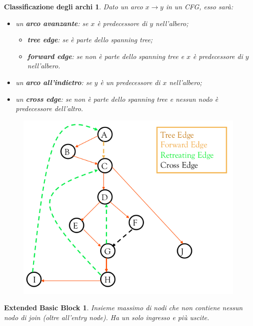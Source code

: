 \documentclass[a4paper, 10pt]{book}
\begin{document}
\newtheorem*{definit3}{Classificazione degli archi}
\begin{definit3}
	Dato un arco $x \rightarrow y$ in un CFG, esso sarà:
	\begin{itemize}
		\item un \textbf{arco avanzante}: se $x$ è predecessore di $y$ nell'albero;
		\begin{itemize}
			\item \textbf{tree edge}: se è parte dello spanning tree;
			\item \textbf{forward edge}: se non è parte dello spanning tree e $x$ è predecessore di $y$ nell'albero.
		\end{itemize}
		\item un \textbf{arco all'indietro}: se $y$ è un predecessore di $x$ nell'albero;
		\item un \textbf{cross edge}: se non è parte dello spanning tree e nessun nodo è predecessore dell'altro.
	\end{itemize}
	\begin{figure}[H]
		\centering
		\includegraphics[scale=0.27]{pngs/Edges}
	\end{figure}
\end{definit3}

\newtheorem*{definit4}{Extended Basic Block}
\begin{definit4}
	Insieme massimo di nodi che non contiene nessun nodo di join (oltre all'entry node). Ha un solo ingresso e più uscite.
\end{definit4}
\end{document}
